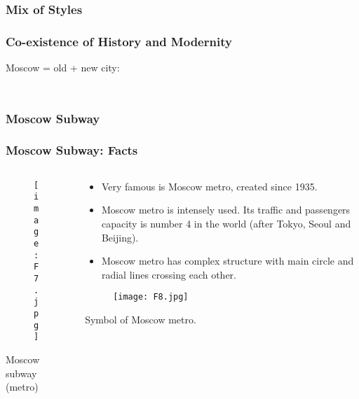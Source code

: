 \documentclass[pdflatex,compress,8pt,
	xcolor={dvipsnames,dvipsnames,svgnames,x11names,table},
	hyperref={colorlinks = true,breaklinks = true, urlcolor = NavyBlue, breaklinks = true}]{beamer}
\begin{document}
\subsubsection{Mix of Styles}
\begin{frame}\frametitle{Co-existence of History and Modernity}
Moscow = old + new city:
\begin{minipage}[0.4\textheight]{\textwidth}
\begin{columns}[T]
\begin{column}{0.4\textwidth}
\begin{figure}[H]
	\centering
			\vspace{2mm}
\end{figure}
\end{column}
\begin{column}{0.6\textwidth}
\begin{figure}[H]
	\centering
			\vspace{2mm}
\end{figure}
\end{column}
\end{columns}
\end{minipage}
\end{frame}

\subsubsection{Moscow Subway}
\begin{frame}\frametitle{Moscow Subway: Facts}
\begin{minipage}[0.4\textheight]{\textwidth}
\begin{columns}[T]
\begin{column}{0.5\textwidth}
\begin{figure}[H]
	\centering
		\texttt{[image: F7.jpg]}
\end{figure}
\small{Moscow subway (metro)}
\end{column}
\begin{column}{0.5\textwidth}
\begin{itemize}
	\item Very famous is Moscow metro, created since 1935.
	\item Moscow metro is intensely used. Its traffic and passengers capacity is number 4 in the world (after Tokyo, Seoul and Beijing).
	\item Moscow metro has complex structure with main circle and radial lines crossing each other.
\end{itemize}
\begin{figure}[H]
	\centering
		\texttt{[image: F8.jpg]}
\end{figure}
Symbol of Moscow metro.
\end{column}
\end{columns}
\end{minipage}
\end{frame}
\end{document}
